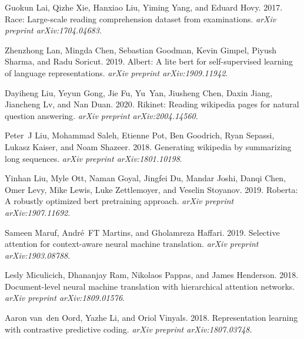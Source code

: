 \documentclass[11pt,a4paper]{article}
\begin{document}
\begin{thebibliography}{44}
Guokun Lai, Qizhe Xie, Hanxiao Liu, Yiming Yang, and Eduard Hovy. 2017.
\newblock Race: Large-scale reading comprehension dataset from examinations.
\newblock \emph{arXiv preprint arXiv:1704.04683}.

Zhenzhong Lan, Mingda Chen, Sebastian Goodman, Kevin Gimpel, Piyush Sharma, and
  Radu Soricut. 2019.
\newblock Albert: A lite bert for self-supervised learning of language
  representations.
\newblock \emph{arXiv preprint arXiv:1909.11942}.

Dayiheng Liu, Yeyun Gong, Jie Fu, Yu~Yan, Jiusheng Chen, Daxin Jiang, Jiancheng
  Lv, and Nan Duan. 2020.
\newblock Rikinet: Reading wikipedia pages for natural question answering.
\newblock \emph{arXiv preprint arXiv:2004.14560}.

Peter~J Liu, Mohammad Saleh, Etienne Pot, Ben Goodrich, Ryan Sepassi, Lukasz
  Kaiser, and Noam Shazeer. 2018.
\newblock Generating wikipedia by summarizing long sequences.
\newblock \emph{arXiv preprint arXiv:1801.10198}.

Yinhan Liu, Myle Ott, Naman Goyal, Jingfei Du, Mandar Joshi, Danqi Chen, Omer
  Levy, Mike Lewis, Luke Zettlemoyer, and Veselin Stoyanov. 2019.
\newblock Roberta: A robustly optimized bert pretraining approach.
\newblock \emph{arXiv preprint arXiv:1907.11692}.

Sameen Maruf, Andr{\'e}~FT Martins, and Gholamreza Haffari. 2019.
\newblock Selective attention for context-aware neural machine translation.
\newblock \emph{arXiv preprint arXiv:1903.08788}.

Lesly Miculicich, Dhananjay Ram, Nikolaos Pappas, and James Henderson. 2018.
\newblock Document-level neural machine translation with hierarchical attention
  networks.
\newblock \emph{arXiv preprint arXiv:1809.01576}.

Aaron van~den Oord, Yazhe Li, and Oriol Vinyals. 2018.
\newblock Representation learning with contrastive predictive coding.
\newblock \emph{arXiv preprint arXiv:1807.03748}.


\end{thebibliography}
\end{document}
